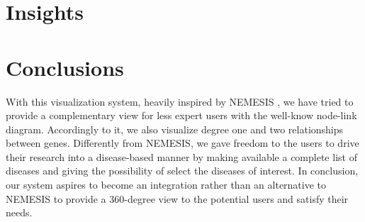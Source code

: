 \documentclass[12pt,twocolumn,twoside]{article}
\begin{document}
	\section*{Insights}
	
	
	\section*{Conclusions}
	With this visualization system, heavily inspired by NEMESIS \cite{ivapp19}, we have tried to provide a complementary view for less expert users with the well-know node-link diagram. Accordingly to it, we also visualize degree one and two relationships between genes. Differently from NEMESIS, we gave freedom to the users to drive their research into a disease-based manner by making available a complete list of diseases and giving the possibility of select the diseases of interest. In conclusion, our system aspires to become an integration rather than an alternative to NEMESIS to provide a 360-degree view to the potential users and satisfy their needs.
	\clearpage
	
	 
	
\end{document}
